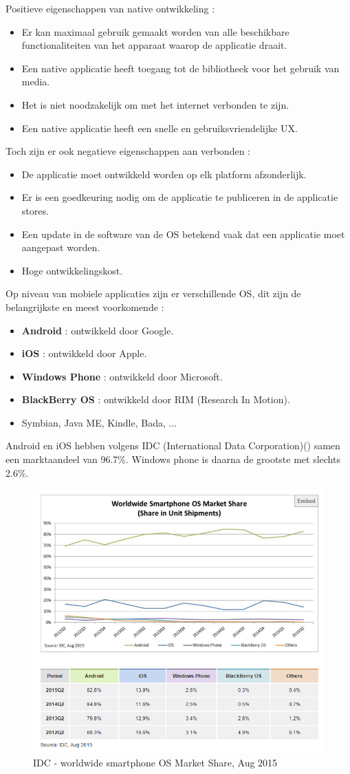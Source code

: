 Positieve eigenschappen van native ontwikkeling : 
\begin{itemize}
\item Er kan maximaal gebruik gemaakt worden van alle beschikbare functionaliteiten van het apparaat waarop de applicatie draait.
\item Een native applicatie heeft toegang tot de bibliotheek voor het gebruik van media.
\item Het is niet noodzakelijk om met het internet verbonden te zijn.
\item Een native applicatie heeft een snelle en gebruiksvriendelijke UX.
\end{itemize}
Toch zijn er ook negatieve eigenschappen aan verbonden : 
\begin{itemize}
\item De applicatie moet ontwikkeld worden op elk platform afzonderlijk.
\item Er is een goedkeuring nodig om de applicatie te publiceren in de applicatie stores.
\item Een update in de software van de OS betekend vaak dat een applicatie moet aangepast worden.
\item Hoge ontwikkelingskost.
\end{itemize}

Op niveau van mobiele applicaties zijn er verschillende OS, dit zijn de belangrijkste en meest voorkomende : 
\begin{itemize}
\item \textbf{Android} : ontwikkeld door Google.
\item \textbf{iOS} : ontwikkeld door Apple.
\item \textbf{Windows Phone} : ontwikkeld door Microsoft.
\item \textbf{BlackBerry OS} : ontwikkeld door RIM (Research In Motion).
\item Symbian, Java ME, Kindle, Bada, ... 
\end{itemize}

Android en iOS hebben volgens IDC (International Data Corporation)() samen een marktaandeel van 96.7\%. Windows phone is daarna de grootste met slechts 2.6\%. \citep{idc:mobile}

	\begin{figure}
		\centering
		\includegraphics[width=.5\columnwidth]{img/idc.png}
		\caption{IDC - worldwide smartphone OS Market Share, Aug 2015}
		\label{fig:idc}
	\end{figure}

